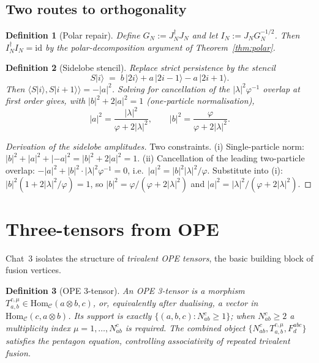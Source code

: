\documentclass[11pt,a4paper]{article}
\newtheorem{definition}{Definition}[section]
\theoremstyle{definition}
\newcommand{\Cc}{\mathcal{C}}
\newcommand{\Hom}{\mathrm{Hom}}
\newcommand{\id}{\mathrm{id}}
\begin{document}
\subsection{Two routes to orthogonality}

\begin{definition}[Polar repair]\label{def:polar-repair}
Define $G_N := J_N^{\dagger}J_N$ and let
$I_N := J_N G_N^{-1/2}$. Then $I_N^{\dagger}I_N=\id$ by the
polar-decomposition argument of Theorem~\ref{thm:polar}.
\end{definition}

\begin{definition}[Sidelobe stencil]\label{def:sidelobe}
Replace strict persistence by the stencil
\[
S|i\rangle \;=\; b\,|2i\rangle + a\,|2i-1\rangle - a\,|2i+1\rangle.
\]
Then $\langle S|i\rangle, S|i+1\rangle\rangle = -|a|^{2}$.
Solving for cancellation of the $|\lambda|^{2}\varphi^{-1}$ overlap at first
order gives, with $|b|^{2}+2|a|^{2}=1$ (one-particle normalisation),
\[
|a|^{2} = \frac{|\lambda|^{2}}{\varphi+2|\lambda|^{2}}, \qquad
|b|^{2} = \frac{\varphi}{\varphi+2|\lambda|^{2}}.
\]
\end{definition}

\begin{proof}[Derivation of the sidelobe amplitudes]
Two constraints. (i) Single-particle norm: $|b|^{2}+|a|^{2}+|-a|^{2}=|b|^{2}+2|a|^{2}=1$.
(ii) Cancellation of the leading two-particle overlap:
$-|a|^{2}+|b|^{2}\cdot|\lambda|^{2}\varphi^{-1} = 0$, i.e.\
$|a|^{2}=|b|^{2}|\lambda|^{2}/\varphi$. Substitute into (i):
$|b|^{2}(1 + 2|\lambda|^{2}/\varphi) = 1$, so $|b|^{2} = \varphi/(\varphi+2|\lambda|^{2})$
and $|a|^{2} = |\lambda|^{2}/(\varphi+2|\lambda|^{2})$.
\end{proof}

\section{Three-tensors from OPE}

Chat~3 isolates the structure of \emph{trivalent OPE tensors}, the basic
building block of fusion vertices.

\begin{definition}[OPE 3-tensor]\label{def:ope3}
An \emph{OPE 3-tensor} is a morphism $T^{c,\mu}_{a,b}\in\Hom_\Cc(a\otimes b, c)$,
or, equivalently after dualising, a vector in
$\Hom_\Cc(c,a\otimes b)$. Its support is exactly $\{(a,b,c):N_{ab}^{c}\ge 1\}$;
when $N_{ab}^{c}\ge 2$ a multiplicity index $\mu=1,\dots,N_{ab}^{c}$ is
required. The combined object $\{N_{ab}^{c}, T^{c,\mu}_{a,b}, F^{abc}_{d}\}$
satisfies the pentagon equation, controlling associativity of repeated
trivalent fusion.
\end{definition}
\end{document}

